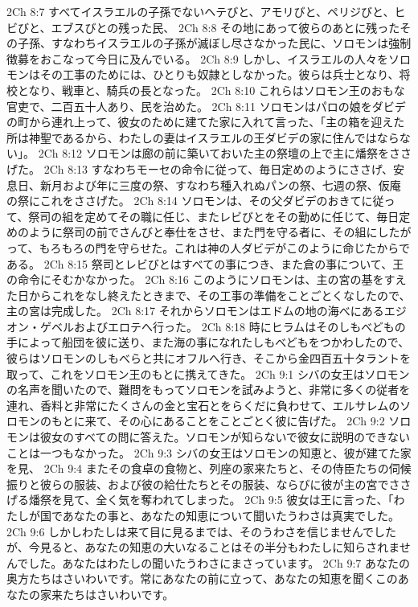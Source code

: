 2Ch 8:7  すべてイスラエルの子孫でないヘテびと、アモリびと、ペリジびと、ヒビびと、エブスびとの残った民、
2Ch 8:8  その地にあって彼らのあとに残ったその子孫、すなわちイスラエルの子孫が滅ぼし尽さなかった民に、ソロモンは強制徴募をおこなって今日に及んでいる。
2Ch 8:9  しかし、イスラエルの人々をソロモンはその工事のためには、ひとりも奴隷としなかった。彼らは兵士となり、将校となり、戦車と、騎兵の長となった。
2Ch 8:10  これらはソロモン王のおもな官吏で、二百五十人あり、民を治めた。
2Ch 8:11  ソロモンはパロの娘をダビデの町から連れ上って、彼女のために建てた家に入れて言った、「主の箱を迎えた所は神聖であるから、わたしの妻はイスラエルの王ダビデの家に住んではならない」。
2Ch 8:12  ソロモンは廊の前に築いておいた主の祭壇の上で主に燔祭をささげた。
2Ch 8:13  すなわちモーセの命令に従って、毎日定めのようにささげ、安息日、新月および年に三度の祭、すなわち種入れぬパンの祭、七週の祭、仮庵の祭にこれをささげた。
2Ch 8:14  ソロモンは、その父ダビデのおきてに従って、祭司の組を定めてその職に任じ、またレビびとをその勤めに任じて、毎日定めのように祭司の前でさんびと奉仕をさせ、また門を守る者に、その組にしたがって、もろもろの門を守らせた。これは神の人ダビデがこのように命じたからである。
2Ch 8:15  祭司とレビびとはすべての事につき、また倉の事について、王の命令にそむかなかった。
2Ch 8:16  このようにソロモンは、主の宮の基をすえた日からこれをなし終えたときまで、その工事の準備をことごとくなしたので、主の宮は完成した。
2Ch 8:17  それからソロモンはエドムの地の海べにあるエジオン・ゲベルおよびエロテへ行った。
2Ch 8:18  時にヒラムはそのしもべどもの手によって船団を彼に送り、また海の事になれたしもべどもをつかわしたので、彼らはソロモンのしもべらと共にオフルへ行き、そこから金四百五十タラントを取って、これをソロモン王のもとに携えてきた。
2Ch 9:1  シバの女王はソロモンの名声を聞いたので、難問をもってソロモンを試みようと、非常に多くの従者を連れ、香料と非常にたくさんの金と宝石とをらくだに負わせて、エルサレムのソロモンのもとに来て、その心にあることをことごとく彼に告げた。
2Ch 9:2  ソロモンは彼女のすべての問に答えた。ソロモンが知らないで彼女に説明のできないことは一つもなかった。
2Ch 9:3  シバの女王はソロモンの知恵と、彼が建てた家を見、
2Ch 9:4  またその食卓の食物と、列座の家来たちと、その侍臣たちの伺候振りと彼らの服装、および彼の給仕たちとその服装、ならびに彼が主の宮でささげる燔祭を見て、全く気を奪われてしまった。
2Ch 9:5  彼女は王に言った、「わたしが国であなたの事と、あなたの知恵について聞いたうわさは真実でした。
2Ch 9:6  しかしわたしは来て目に見るまでは、そのうわさを信じませんでしたが、今見ると、あなたの知恵の大いなることはその半分もわたしに知らされませんでした。あなたはわたしの聞いたうわさにまさっています。
2Ch 9:7  あなたの奥方たちはさいわいです。常にあなたの前に立って、あなたの知恵を聞くこのあなたの家来たちはさいわいです。
